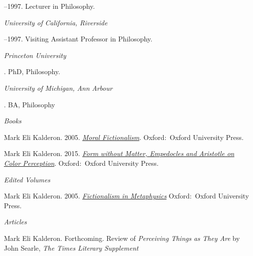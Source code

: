 \documentclass[11pt]{article}
\begin{document}
--1997. Lecturer in Philosophy.

\medskip
\noindent\emph{University of California, Riverside \vspace{0.01in}}

--1997. Visiting Assistant Professor in Philosophy.


\bigskip



\noindent\emph{Princeton University \vspace{0.01in}}

. PhD, Philosophy.

\medskip
\noindent\emph{University of Michigan, Ann Arbour\vspace{0.02in}}

. BA, Philosophy

\bigskip
 
\medskip
\noindent\emph{Books \vspace{0.01in}}

\ind Mark Eli Kalderon. 2005. \emph{\href{http://ukcatalogue.oup.com/product/9780199275977.do}{Moral Fictionalism}}. Oxford:~Oxford University Press. %

\ind Mark Eli Kalderon. 2015. \emph{\href{http://ukcatalogue.oup.com/product/9780198717904.do}{Form without Matter, Empedocles and Aristotle on Color Perception}}. Oxford:~Oxford University Press. %

\medskip
\noindent\emph{Edited Volumes \vspace{0.01in}}

\ind Mark Eli Kalderon. 2005. \emph{\href{http://ukcatalogue.oup.com/product/9780199282180.do}{Fictionalism in Metaphysics}} Oxford:~Oxford University Press. %
 
\normalsize

\bigskip
\noindent\emph{Articles \vspace{0.05in}}
 

\ind Mark Eli Kalderon. Forthcoming. Review of \emph{Perceiving Things as They Are} by John Searle, \emph{The Times Literary Supplement}
\end{document}
